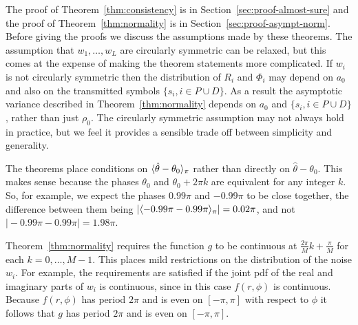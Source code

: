 \documentclass[draftcls, onecolumn, 11pt]{IEEEtran}
\begin{document}
The proof of Theorem~\ref{thm:consistency} is in Section~\ref{sec:proof-almost-sure} and the proof of Theorem~\ref{thm:normality} is in Section~\ref{sec:proof-asympt-norm}.  Before giving the proofs we discuss the assumptions made by these theorems.  The assumption that $w_1, \dots, w_L$ are circularly symmetric can be relaxed, but this comes at the expense of making the theorem statements more complicated.  If $w_i$ is not circularly symmetric then the distribution of $R_i$ and $\Phi_i$ may depend on $a_0$ and also on the transmitted symbols $\{s_i,i \in P \cup D\}$.  As a result the asymptotic variance described in Theorem~\ref{thm:normality} depends on $a_0$ and $\{s_i,i \in P \cup D\}$, rather than just $\rho_0$.  The circularly symmetric assumption may not always hold in practice, but we feel it provides a sensible trade off between simplicity and generality.  


The theorems place conditions on $\langle \hat{\theta} - \theta_0 \rangle_\pi$ rather than directly on $\hat{\theta}  - \theta_0$.  This makes sense because the phases $\theta_0$ and $\theta_0 + 2\pi k$ are equivalent for any integer $k$. So, for example, we expect the phases $0.99\pi$ and $-0.99\pi$ to be close together, the difference between them being $\vert\langle -0.99\pi - 0.99\pi \rangle_\pi\vert = 0.02\pi$, and not $\vert -0.99\pi - 0.99\pi\vert = 1.98\pi$.

Theorem~\ref{thm:normality} requires the function $g$ to be continuous at $\tfrac{2\pi}{M}k + \tfrac{\pi}{M}$ for each $k = 0, \dots, M-1$.  This places mild restrictions on the distribution of the noise $w_i$.  For example, the requirements are satisfied if the joint pdf of the real and imaginary parts of $w_i$ is continuous, since in this case $f(r,\phi)$ is continuous.  Because $f(r,\phi)$ has period $2\pi$ and is even on $[-\pi,\pi]$ with respect to $\phi$ it follows that $g$ has period $2\pi$ and is even on $[-\pi, \pi]$.

\end{document}
